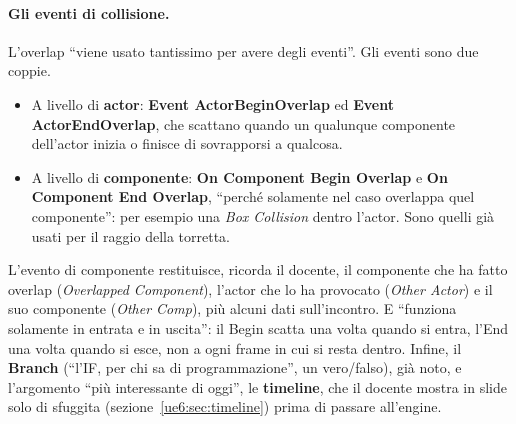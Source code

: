\paragraph{Gli eventi di collisione.} L'overlap ``viene usato tantissimo per avere degli
eventi''. Gli eventi sono due coppie.
\begin{itemize}
  \item A livello di \textbf{actor}: \textbf{Event ActorBeginOverlap} ed \textbf{Event
        ActorEndOverlap}, che scattano quando un qualunque componente dell'actor inizia
        o finisce di sovrapporsi a qualcosa.
  \item A livello di \textbf{componente}: \textbf{On Component Begin Overlap} e
        \textbf{On Component End Overlap}, ``perché solamente nel caso overlappa quel
        componente'': per esempio una \emph{Box Collision} dentro l'actor. Sono quelli
        già usati per il raggio della torretta.
\end{itemize}
L'evento di componente restituisce, ricorda il docente, il componente che ha fatto
overlap (\emph{Overlapped Component}), l'actor che lo ha provocato (\emph{Other Actor}) e
il suo componente (\emph{Other Comp}), più alcuni dati sull'incontro. E
``funziona solamente in entrata e in uscita'': il Begin scatta una volta quando si
entra, l'End una volta quando si esce, non a ogni frame in cui si resta dentro. Infine,
il \textbf{Branch} (``l'IF, per chi sa di programmazione'', un vero/falso), già noto, e
l'argomento ``più interessante di oggi'', le \textbf{timeline}, che il docente mostra in
slide solo di sfuggita (sezione~\ref{ue6:sec:timeline}) prima di passare all'engine.

